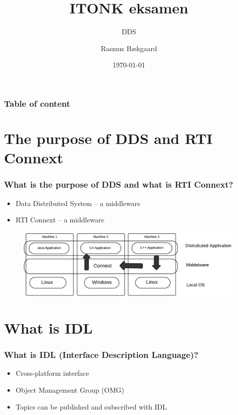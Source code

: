 \documentclass{beamer}
\title{ITONK eksamen}
\subtitle{DDS}
\author %
{Rasmus Bækgaard\inst{1}}
\institute%
{
  \inst{1}%
  Information og Kommunikationsteknologi\\
  Ingeniørhøjskolen i Aarhus
}
\date{\today}
\begin{document}
	\frame{\titlepage}
	
	\begin{frame}
		\frametitle{Table of content}
		\tableofcontents%
	\end{frame}

\section{The purpose of DDS and RTI Connext}
	\begin{frame}
		\frametitle{What is the purpose of DDS and what is RTI Connext?}
		
		\begin{itemize}
		\item Data Distributed System -- a middleware
		\item RTI Connext -- a middleware 
		\end{itemize}
		
		\begin{figure}[hbtp]
		\centering
		\includegraphics[scale=0.35]{MiddelwareImplementation}
		\end{figure}
				
	\end{frame}
		
	
\section{What is IDL}
	\begin{frame}
		\frametitle{What is IDL (Interface Description Language)?}
		
		\begin{itemize}
		\item Cross-platform interface
		\item Object Management Group (OMG)
		\item Topics can be published and subscribed with IDL
		
		\end{itemize}
		
	\end{frame}
	
\end{document}
